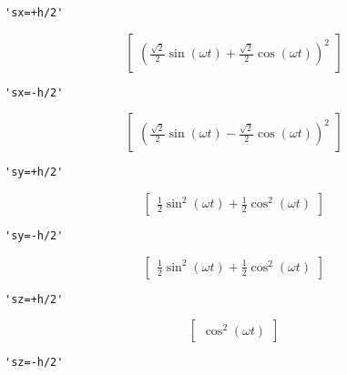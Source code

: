\documentclass[11pt]{article}
\begin{document}
    
    \begin{verbatim}
'sx=+h/2'
    \end{verbatim}

    
    $$\left[\begin{matrix}\left(\frac{\sqrt{2}}{2} \sin{\left (\omega t \right )} + \frac{\sqrt{2}}{2} \cos{\left (\omega t \right )}\right)^{2}\end{matrix}\right]$$

    
    
    \begin{verbatim}
'sx=-h/2'
    \end{verbatim}

    
    $$\left[\begin{matrix}\left(\frac{\sqrt{2}}{2} \sin{\left (\omega t \right )} - \frac{\sqrt{2}}{2} \cos{\left (\omega t \right )}\right)^{2}\end{matrix}\right]$$

    
    
    \begin{verbatim}
'sy=+h/2'
    \end{verbatim}

    
    $$\left[\begin{matrix}\frac{1}{2} \sin^{2}{\left (\omega t \right )} + \frac{1}{2} \cos^{2}{\left (\omega t \right )}\end{matrix}\right]$$

    
    
    \begin{verbatim}
'sy=-h/2'
    \end{verbatim}

    
    $$\left[\begin{matrix}\frac{1}{2} \sin^{2}{\left (\omega t \right )} + \frac{1}{2} \cos^{2}{\left (\omega t \right )}\end{matrix}\right]$$

    
    
    \begin{verbatim}
'sz=+h/2'
    \end{verbatim}

    
    $$\left[\begin{matrix}\cos^{2}{\left (\omega t \right )}\end{matrix}\right]$$

    
    
    \begin{verbatim}
'sz=-h/2'
    \end{verbatim}
\end{document}
